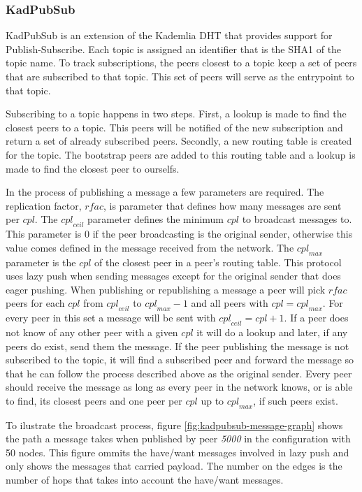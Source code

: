 \documentclass[sigconf]{acmart}
\begin{document}
\subsubsection{KadPubSub}
KadPubSub is an extension of the Kademlia DHT that provides support for Publish-Subscribe.
Each topic is assigned an identifier that is the SHA1 of the topic name.
To track subscriptions, the peers closest to a topic keep a set of peers that are subscribed to that topic. This set of peers will serve as the entrypoint to that topic.


Subscribing to a topic happens in two steps.
First, a lookup is made to find the closest peers to a topic.
This peers will be notified of the new subscription and return a set of already subscribed peers.
Secondly, a new routing table is created for the topic. The bootstrap peers are added to this routing table and a lookup is made to find the closest peer to ourselfs.

In the process of publishing a message a few parameters are required.
The replication factor, $\mathit{rfac}$, is parameter that defines how many messages are sent per $\mathit{cpl}$.
The $\mathit{cpl}_{ceil}$ parameter defines the minimum $\mathit{cpl}$ to broadcast messages to. This parameter is $0$ if the peer broadcasting is the original sender, otherwise this value comes defined in the message received from the network.
The $\mathit{cpl}_{max}$ parameter is the $cpl$ of the closest peer in a peer's routing table.
This protocol uses lazy push when sending messages except for the original sender that does eager pushing.
When publishing or republishing a message a peer will pick $\mathit{rfac}$ peers for each $\mathit{cpl}$ from $\mathit{cpl}_{ceil}$ to $\mathit{cpl}_{max} - 1$ and all peers with $\mathit{cpl} = \mathit{cpl}_{max}$.
For every peer in this set a message will be sent with $\mathit{cpl}_{ceil} = \mathit{cpl} + 1$. If a peer does not know of any other peer with a given $\mathit{cpl}$ it will do a lookup and later, if any peers do exist, send them the message.
If the peer publishing the message is not subscribed to the topic, it will find a subscribed peer and forward the message so that he can follow the process described above as the original sender.
Every peer should receive the message as long as every peer in the network knows, or is able to find, its closest peers and one peer per $\mathit{cpl}$ up to $\mathit{cpl}_{max}$, if such peers exist.

To ilustrate the broadcast process, figure \ref{fig:kadpubsub-message-graph} shows the path a message takes when published by peer \textit{5000} in the configuration with 50 nodes. This figure ommits the have/want messages involved in lazy push and only shows the messages that carried payload. The number on the edges is the number of hops that takes into account the have/want messages.
\end{document}
